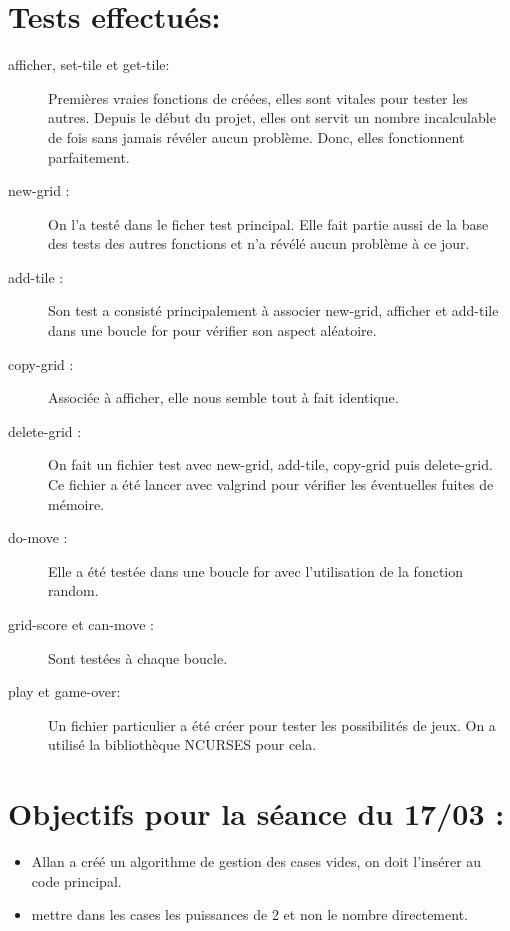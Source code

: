 \documentclass{report}
\begin{document}
\section*{Tests effectu\'{e}s:}
\begin{description}
\item [afficher, set-tile et get-tile:] Premi\`{e}res vraies fonctions de cr\'{e}\'{e}es, elles sont vitales pour tester les autres. Depuis le d\'{e}but du projet, elles ont servit un nombre incalculable de fois sans jamais r\'{e}v\'{e}ler aucun probl\`{e}me. Donc, elles fonctionnent parfaitement.\\
\item [new-grid :] On l'a test\'{e} dans le ficher test principal. Elle fait partie aussi de la base des tests des autres fonctions et n'a r\'{e}v\'{e}l\'{e} aucun probl\`{e}me \`{a} ce jour.\\
\item [add-tile :] Son test a consist\'{e} principalement \`{a} associer new-grid, afficher et add-tile dans une boucle for pour v\'{e}rifier son aspect al\'{e}atoire.\\
\item [copy-grid :]Associ\'{e}e \`{a} afficher, elle nous semble tout \`{a} fait identique.\\
\item [delete-grid :] On fait un fichier test avec new-grid, add-tile, copy-grid puis delete-grid. Ce fichier a \'{e}t\'{e} lancer avec valgrind pour v\'{e}rifier les \'{e}ventuelles fuites de m\'{e}moire.\\
\item [do-move :] Elle a \'{e}t\'{e} test\'{e}e dans une boucle for avec l'utilisation de la fonction random.\\
\item [grid-score et can-move :] Sont test\'{e}es \`{a} chaque boucle.\\

\item [play et game-over:] Un fichier particulier a \'{e}t\'{e} cr\'{e}er pour tester les possibilit\'{e}s de jeux. On a utilis\'{e} la biblioth\`{e}que NCURSES pour cela.  
\end{description}

\section*{Objectifs pour la s\'{e}ance du 17/03 :}
\begin{itemize}

\item Allan a cr\'{e}\'{e} un algorithme de gestion des cases vides, on doit l'ins\'{e}rer au code principal.\\

\item mettre dans les cases les puissances de 2 et non le nombre directement.

	
\end{itemize}
\end{document}
